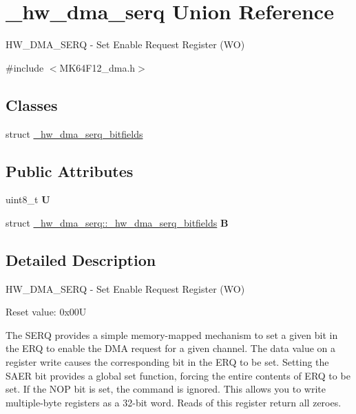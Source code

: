 \hypertarget{union__hw__dma__serq}{}\section{\+\_\+hw\+\_\+dma\+\_\+serq Union Reference}
\label{union__hw__dma__serq}


H\+W\+\_\+\+D\+M\+A\+\_\+\+S\+E\+RQ -\/ Set Enable Request Register (WO)  




{\ttfamily \#include $<$M\+K64\+F12\+\_\+dma.\+h$>$}

\subsection*{Classes}
\begin{DoxyCompactItemize}
\item 
struct \hyperlink{struct__hw__dma__serq_1_1__hw__dma__serq__bitfields}{\+\_\+hw\+\_\+dma\+\_\+serq\+\_\+bitfields}
\end{DoxyCompactItemize}
\subsection*{Public Attributes}
\begin{DoxyCompactItemize}
\item 
uint8\+\_\+t {\bfseries U}\hypertarget{union__hw__dma__serq_abd7b03902fc14e436116e8c3e172e267}{}\label{union__hw__dma__serq_abd7b03902fc14e436116e8c3e172e267}

\item 
struct \hyperlink{struct__hw__dma__serq_1_1__hw__dma__serq__bitfields}{\+\_\+hw\+\_\+dma\+\_\+serq\+::\+\_\+hw\+\_\+dma\+\_\+serq\+\_\+bitfields} {\bfseries B}\hypertarget{union__hw__dma__serq_a9ae45e974dbbff67e80a5571602b18b8}{}\label{union__hw__dma__serq_a9ae45e974dbbff67e80a5571602b18b8}

\end{DoxyCompactItemize}


\subsection{Detailed Description}
H\+W\+\_\+\+D\+M\+A\+\_\+\+S\+E\+RQ -\/ Set Enable Request Register (WO) 

Reset value\+: 0x00U

The S\+E\+RQ provides a simple memory-\/mapped mechanism to set a given bit in the E\+RQ to enable the D\+MA request for a given channel. The data value on a register write causes the corresponding bit in the E\+RQ to be set. Setting the S\+A\+ER bit provides a global set function, forcing the entire contents of E\+RQ to be set. If the N\+OP bit is set, the command is ignored. This allows you to write multiple-\/byte registers as a 32-\/bit word. Reads of this register return all zeroes. 

